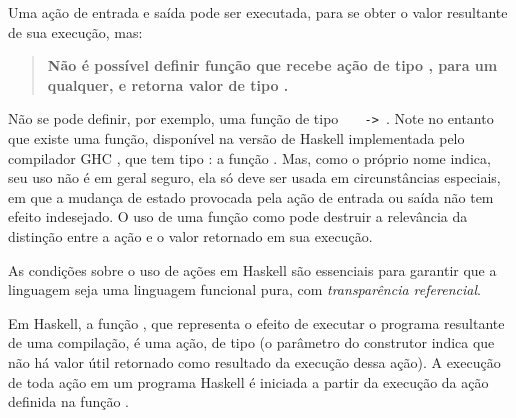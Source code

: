 Uma ação de entrada e saída pode ser executada, para se obter o valor
resultante de sua execução, mas:

  \begin{quotation}
    {\bf Não é possível definir função que recebe ação de tipo , 
         para um  qualquer, e retorna valor de tipo .}
  \end{quotation}

Não se pode definir, por exemplo, uma função de tipo {\tt
  \IO\ \Char\ -> \Char}.  Note no entanto que existe uma função,
disponível na versão de Haskell implementada pelo compilador GHC
\cite{GHC}, que tem tipo : a função
.  Mas, como o próprio nome indica, seu uso não é
em geral seguro, ela só deve ser usada em circunstâncias especiais, em
que a mudança de estado provocada pela ação de entrada ou saída não
tem efeito indesejado. O uso de uma função como 
pode destruir a relevância da distinção entre a ação e o valor
retornado em sua execução.

As condições sobre o uso de ações em Haskell são essenciais para
garantir que a linguagem seja uma linguagem funcional pura, com {\em
  transparência referencial}.


Em Haskell, a função , que representa o efeito de executar o
programa resultante de uma compilação, é uma ação, de tipo 
(o parâmetro \ina{()} do construtor  indica que não há valor
útil retornado como resultado da execução dessa ação). A execução de
toda ação em um programa Haskell é iniciada a partir da execução da
ação definida na função .



